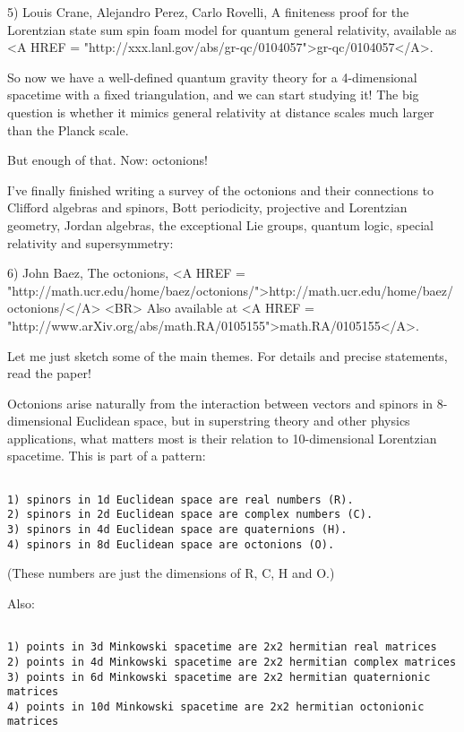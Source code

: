 5) Louis Crane, Alejandro Perez, Carlo Rovelli, A finiteness proof for
the Lorentzian state sum spin foam model for quantum general relativity,
available as <A HREF = "http://xxx.lanl.gov/abs/gr-qc/0104057">gr-qc/0104057</A>.

So now we have a well-defined quantum gravity theory for a 4-dimensional
spacetime with a fixed triangulation, and we can start studying it!  The
big question is whether it mimics general relativity at distance scales
much larger than the Planck scale.

But enough of that.   Now: octonions!

I've finally finished writing a survey of the octonions and their
connections to Clifford algebras and spinors, Bott periodicity, 
projective and Lorentzian geometry, Jordan algebras, the exceptional 
Lie groups, quantum logic, special relativity and supersymmetry:

6) John Baez, The octonions, 
<A HREF =
"http://math.ucr.edu/home/baez/octonions/">http://math.ucr.edu/home/baez/octonions/</A>
<BR>
Also available at <A HREF = "http://www.arXiv.org/abs/math.RA/0105155">math.RA/0105155</A>.

Let me just sketch some of the main themes.  For details and precise
statements, read the paper!

Octonions arise naturally from the interaction between vectors and
spinors in 8-dimensional Euclidean space, but in superstring theory and
other physics applications, what matters most is their relation to
10-dimensional Lorentzian spacetime.  This is part of a pattern:


\begin{verbatim}

1) spinors in 1d Euclidean space are real numbers (R).
2) spinors in 2d Euclidean space are complex numbers (C).
3) spinors in 4d Euclidean space are quaternions (H).
4) spinors in 8d Euclidean space are octonions (O).
\end{verbatim}
    
(These numbers are just the dimensions of R, C, H and O.)

Also:


\begin{verbatim}

1) points in 3d Minkowski spacetime are 2x2 hermitian real matrices
2) points in 4d Minkowski spacetime are 2x2 hermitian complex matrices
3) points in 6d Minkowski spacetime are 2x2 hermitian quaternionic matrices
4) points in 10d Minkowski spacetime are 2x2 hermitian octonionic matrices
\end{verbatim}
    
